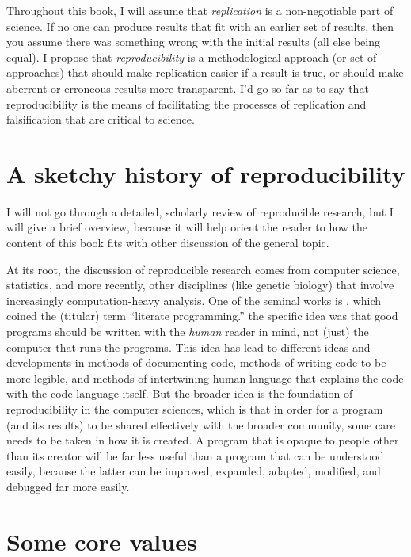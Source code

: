 \documentclass{book}
\begin{document}
Throughout this book, I will assume that \emph{replication} is a non-negotiable part of science.  If no one can produce results that fit with an earlier set of results, then you assume there was something wrong with the initial results (all else being equal).  I propose that \emph{reproducibility} is a methodological approach (or set of approaches) that should make replication easier if a result is true, or should make aberrent or erroneous results more transparent.  I'd go so far as to say that reproducibility is the means of facilitating the processes of replication and falsification that are critical to science.
\section{A sketchy history of reproducibility}
\label{sec-2-2}

I will not go through a detailed, scholarly review of reproducible research, but I will give a brief overview, because it will help orient the reader to how the content of this book fits with other discussion of the general topic.

At its root, the discussion of reproducible research comes from computer science, statistics, and more recently, other disciplines (like genetic biology) that involve increasingly computation-heavy analysis. One of the seminal works is \textcite{knuth1984literate}, which coined the (titular) term ``literate programming.'' the specific idea was that good programs should be written with the \emph{human} reader in mind, not (just) the computer that runs the programs. This idea has lead to different ideas and developments in methods of documenting code, methods of writing code to be more legible, and methods of intertwining human language that explains the code with the code language itself. But the broader idea is the foundation of reproducibility in the computer sciences, which is that in order for a program (and its results) to be shared effectively with the broader community, some care needs to be taken in how it is created. A program that is opaque to people other than its creator will be far less useful than a program that can be understood easily, because the latter can be improved, expanded, adapted, modified, and debugged far more easily.
   
\section{Some core values}
\label{sec-2-3}
\end{document}
